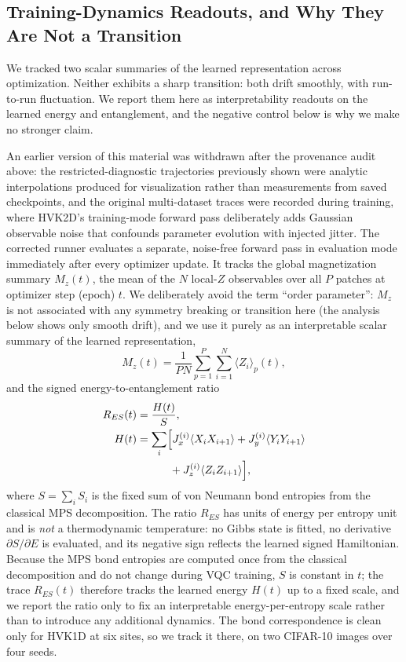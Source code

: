 \documentclass[11pt]{article}
\begin{document}
\subsection{Training-Dynamics Readouts, and Why They Are Not a Transition}
\label{sec:phase_transition}
We tracked two scalar summaries of the learned representation across optimization. Neither exhibits a sharp transition: both drift smoothly, with run-to-run fluctuation. We report them here as interpretability readouts on the learned energy and entanglement, and the negative control below is why we make no stronger claim.

An earlier version of this material was withdrawn after the provenance audit above: the restricted-diagnostic trajectories previously shown were analytic interpolations produced for visualization rather than measurements from saved checkpoints, and the original multi-dataset traces were recorded during training, where HVK2D's training-mode forward pass deliberately adds Gaussian observable noise that confounds parameter evolution with injected jitter. The corrected runner evaluates a separate, noise-free forward pass in evaluation mode immediately after every optimizer update. It tracks the global magnetization summary $M_z(t)$, the mean of the $N$ local-$Z$ observables over all $P$ patches at optimizer step (epoch) $t$. We deliberately avoid the term ``order parameter'': $M_z$ is not associated with any symmetry breaking or transition here (the analysis below shows only smooth drift), and we use it purely as an interpretable scalar summary of the learned representation,
\begin{equation}
M_z(t) = \frac{1}{P N}\sum_{p=1}^{P}\sum_{i=1}^{N}\langle Z_i\rangle_p(t),
\label{eq:order_parameter}
\end{equation}
and the signed energy-to-entanglement ratio
\begin{align}
R_{ES}(t)&=\frac{H(t)}{S},\\
H(t)&=\sum_i\Bigl[J_x^{(i)}\langle X_iX_{i+1}\rangle
+J_y^{(i)}\langle Y_iY_{i+1}\rangle \nonumber\\
&\hspace{3.0em}+J_z^{(i)}\langle Z_iZ_{i+1}\rangle\Bigr],
\end{align}
where $S=\sum_i S_i$ is the fixed sum of von Neumann bond entropies from the classical MPS decomposition. The ratio $R_{ES}$ has units of energy per entropy unit and is \emph{not} a thermodynamic temperature: no Gibbs state is fitted, no derivative $\partial S/\partial E$ is evaluated, and its negative sign reflects the learned signed Hamiltonian. Because the MPS bond entropies are computed once from the classical decomposition and do not change during VQC training, $S$ is constant in $t$; the trace $R_{ES}(t)$ therefore tracks the learned energy $H(t)$ up to a fixed scale, and we report the ratio only to fix an interpretable energy-per-entropy scale rather than to introduce any additional dynamics. The bond correspondence is clean only for HVK1D at six sites, so we track it there, on two CIFAR-10 images over four seeds.
\end{document}
